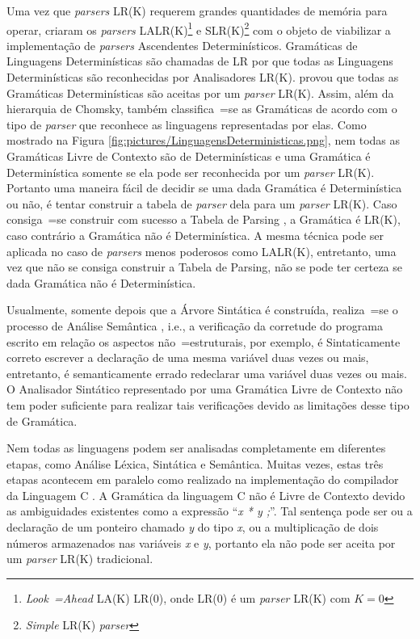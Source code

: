 {    Uma vez que \textit{parsers} LR(K) requerem grandes quantidades de memória para operar,
     criaram os \textit{parsers}
    LALR(K)\footnote{\textit{Look~=Ahead} LA(K) LR(0),
    onde LR(0) é um \textit{parser} LR(K) com $K=0$
    } e
    SLR(K)\footnote{\textit{Simple} LR(K) \textit{parser}} com o objeto de
    viabilizar a implementação de \textit{parsers} Ascendentes Determinísticos.
    Gramáticas de Linguagens Determinísticas são chamadas de LR por que todas
    as Linguagens Determinísticas são reconhecidas por Analisadores LR(K).
     provou que todas as Gramáticas
    Determinísticas são aceitas por um \textit{parser} LR(K).
    Assim,
    além da hierarquia de Chomsky,
    também classifica~=se as Gramáticas de acordo com o tipo de
    \textit{parser} que reconhece as linguagens representadas por elas.
    Como mostrado na Figura \ref{fig:pictures/LinguagensDeterministicas.png},
    nem todas as Gramáticas Livre de Contexto são de Determinísticas e
    uma Gramática é Determinística somente se ela pode ser reconhecida por um \textit{parser} LR(K).
    Portanto uma maneira fácil de decidir se uma dada Gramática é Determinística ou não,
    é tentar construir a tabela de \textit{parser} dela para um \textit{parser} LR(K).
    Caso consiga~=se construir com sucesso a Tabela de Parsing \cite{ahoCompilerDragonBook},
    a Gramática é LR(K),
    caso contrário a Gramática não é Determinística.
    A mesma técnica pode ser aplicada no caso de \textit{parsers} menos poderosos como LALR(K),
    entretanto,
    uma vez que não se consiga construir a Tabela de Parsing,
    não se pode ter certeza se dada Gramática não é Determinística.

    Usualmente,
    somente depois que a Árvore Sintática é construída,
    realiza~=se o processo de Análise Semântica \cite{ahoCompilerDragonBook},
    i.e.,
    a verificação da corretude do programa escrito em relação os aspectos não~=estruturais,
    por exemplo,
    é Sintaticamente correto escrever a declaração de uma mesma variável duas vezes ou mais,
    entretanto,
    é semanticamente errado redeclarar uma variável duas vezes ou mais.
    O Analisador Sintático representado por uma Gramática Livre de Contexto não tem poder
    suficiente para realizar tais verificações devido as limitações desse tipo de Gramática.

    Nem todas as linguagens podem ser analisadas completamente em diferentes etapas,
    como Análise Léxica, Sintática e Semântica. Muitas vezes,
    estas três etapas acontecem em paralelo como realizado na implementação do
    compilador da Linguagem C \cite{jourdan2017,whyCcannotBeParsedWithALR1Parser}.
    A Gramática da linguagem C não é Livre de Contexto devido as
    ambiguidades existentes como a expressão ``\textit{x * y ;}''.
    Tal sentença pode ser ou a declaração de um ponteiro chamado \textit{y} do tipo \textit{x},
    ou a multiplicação de dois números armazenados nas variáveis \textit{x} e
    \textit{y},
    portanto ela não pode ser aceita por um \textit{parser} LR(K) tradicional.

}

